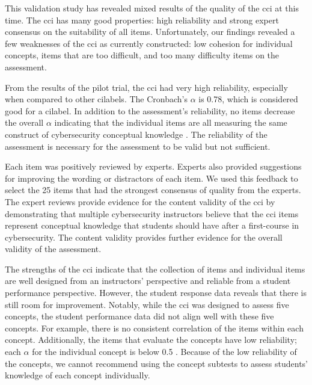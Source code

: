 


This validation study has revealed mixed results of the quality of the \gls{cci} at this time. The \gls{cci} has many good properties: high reliability and strong expert consensus on the suitability of all items. Unfortunately, our findings revealed a few weaknesses of the \gls{cci} as currently constructed: low cohesion for individual concepts, items that are too difficult, and too many difficulty items on the assessment.

From the results of the pilot trial, the \gls{cci} had very high reliability, especially when compared to other \glspl{cilabel}. The Cronbach's $\alpha$ is 0.78, which is considered good for a \gls{cilabel}. In addition to the assessment's reliability, no items decrease the overall $\alpha$ indicating that the individual items are all measuring the same construct of cybersecurity conceptual knowledge \cite{dlci}. The reliability of the assessment is necessary for the assessment to be valid but not sufficient.

Each item was positively reviewed by experts. Experts also provided suggestions for improving the wording or distractors of each item. We used this feedback to select the 25 items that had the strongest consensus of quality from the experts. The expert reviews provide evidence for the content validity of the \gls{cci} by demonstrating that multiple cybersecurity instructors believe that the \gls{cci} items represent conceptual knowledge that students should have after a first-course in cybersecurity. The content validity provides further evidence for the overall validity of the assessment.


The strengths of the \gls{cci} indicate that the collection of items and individual items are well designed from an instructors' perspective and reliable from a student performance perspective. However, the student response data reveals that there is still room for improvement. Notably, while the \gls{cci} was designed to assess five concepts, the student performance data did not align well with these five concepts. For example, there is no consistent correlation of the items within each concept. Additionally, the items that evaluate the concepts have low reliability; each $\alpha$ for the individual concept is below 0.5 \cite{jorian}. Because of the low reliability of the concepts, we cannot recommend using the concept subtests to assess students' knowledge of each concept individually.

